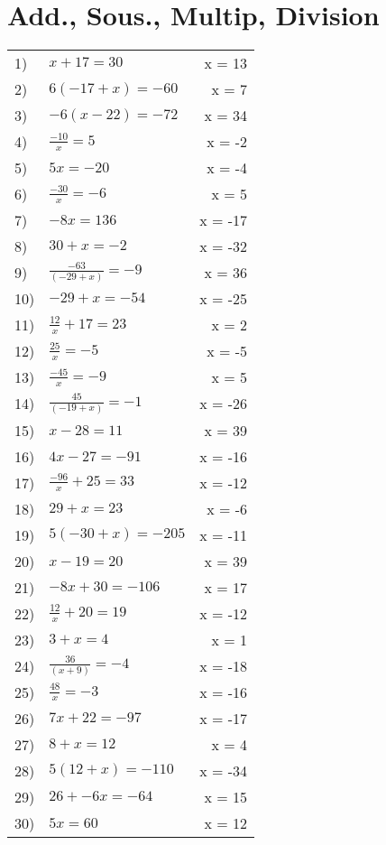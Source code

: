 \documentclass{article}
\begin{document}
\section{Add., Sous., Multip, Division}

\begin{longtable}{l p{} r}
1) & $x + 17 = 30$ & x = 13 \\ 
2) & $6(-17 + x) = -60$ & x = 7 \\ 
3) & $-6(x - 22) = -72$ & x = 34 \\ 
4) & $\frac{ -10 }{ x } = 5$ & x = -2 \\ 
5) & $5x = -20$ & x = -4 \\ 
6) & $\frac{ -30 }{ x } = -6$ & x = 5 \\ 
7) & $-8x = 136$ & x = -17 \\ 
8) & $30 + x = -2$ & x = -32 \\ 
9) & $\frac{ -63 }{ (-29 + x) } = -9$ & x = 36 \\ 
10) & $-29 + x = -54$ & x = -25 \\ 
11) & $\frac{ 12 }{ x } + 17 = 23$ & x = 2 \\ 
12) & $\frac{ 25 }{ x } = -5$ & x = -5 \\ 
13) & $\frac{ -45 }{ x } = -9$ & x = 5 \\ 
14) & $\frac{ 45 }{ (-19 + x) } = -1$ & x = -26 \\ 
15) & $x - 28 = 11$ & x = 39 \\ 
16) & $4x - 27 = -91$ & x = -16 \\ 
17) & $\frac{ -96 }{ x } + 25 = 33$ & x = -12 \\ 
18) & $29 + x = 23$ & x = -6 \\ 
19) & $5(-30 + x) = -205$ & x = -11 \\ 
20) & $x - 19 = 20$ & x = 39 \\ 
21) & $-8x + 30 = -106$ & x = 17 \\ 
22) & $\frac{ 12 }{ x } + 20 = 19$ & x = -12 \\ 
23) & $3 + x = 4$ & x = 1 \\ 
24) & $\frac{ 36 }{ (x + 9) } = -4$ & x = -18 \\ 
25) & $\frac{ 48 }{ x } = -3$ & x = -16 \\ 
26) & $7x + 22 = -97$ & x = -17 \\ 
27) & $8 + x = 12$ & x = 4 \\ 
28) & $5(12 + x) = -110$ & x = -34 \\ 
29) & $26 + -6x = -64$ & x = 15 \\ 
30) & $5x = 60$ & x = 12 
\end{longtable}
\end{document}
